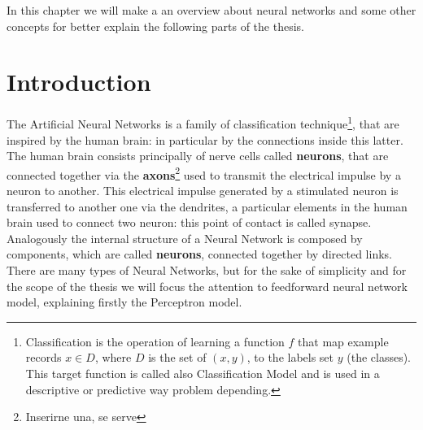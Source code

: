 \label{sl-nn}
In this chapter we will make a an overview about neural networks and some other concepts  for better explain the following parts of the thesis.

\section{Introduction}
The Artificial Neural Networks is a family of classification technique\footnote{Classification is the operation of learning a function \textbf{$f$} that map example records \textbf{$x \in D$}, where $D$ is the set of \textbf{$(x, y)$}, to the labels set \textbf{$y$} (the classes). This target function is called also Classification Model and is used in a descriptive or predictive way problem depending.}, that are inspired by the human brain: in particular by the connections inside this latter. The human brain consists principally of nerve cells called \textbf{neurons}, that are connected together via the \textbf{axons}\footnote{Inserirne una, se serve} used to transmit the electrical impulse by a neuron to another. This electrical impulse generated by a stimulated neuron is transferred to another one via the dendrites, a particular elements in the human brain used to connect two neuron: this point of contact is called synapse. \newline Analogously the internal structure of a Neural Network is composed by components, which are called \textbf{neurons}, connected together by directed links. There are many types of Neural Networks, but for the sake of simplicity and  for the scope of the thesis we will focus the attention to feedforward neural network model, explaining firstly the Perceptron model.


